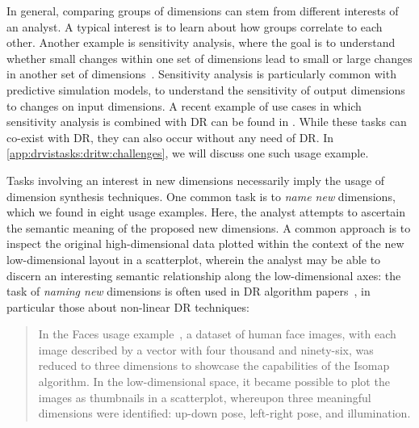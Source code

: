 In general, comparing groups of dimensions can stem from different interests of an analyst. 
A typical interest is to learn about how groups correlate to each other. 
Another example is sensitivity analysis, where the goal is to understand whether small changes within one set of dimensions lead to small or large changes in another set of dimensions~\cite{Booshehrian2012,Piringer2010,Pretorius2011}. 
Sensitivity analysis is particularly common with predictive simulation models, to understand the sensitivity of output dimensions to changes on input dimensions. 
A recent example of use cases in which sensitivity analysis is combined with \ac{DR} can be found in \citet{Bergner2013}.
While these tasks can co-exist with \ac{DR}, they can also occur without any need of \ac{DR}. In \autoref{app:drvistasks:dritw:challenges}, we will discuss one such usage example.

Tasks involving an interest in new dimensions necessarily imply the usage of dimension synthesis techniques. 
One common task is to {\it name new} dimensions, which we found in eight usage examples. Here, the analyst attempts to ascertain the semantic meaning of the proposed new dimensions. 
A common approach is to inspect the original high-dimensional data plotted within the context of the new low-dimensional layout in a scatterplot, wherein the analyst may be able to discern an interesting semantic relationship along the low-dimensional axes: the task of {\it naming new} dimensions is often used in \ac{DR} algorithm papers~\cite{Buja2002,Tenenbaum2000}, in particular those about non-linear \ac{DR} techniques:

\begin{quotation}
    In the {\sc Faces} usage example~\cite{Tenenbaum2000}, a dataset of human face images, with each image described by a vector with four thousand and ninety-six, was reduced to three dimensions to showcase the capabilities of the Isomap algorithm. 
    In the low-dimensional space, it became possible to plot the images as thumbnails in a scatterplot, whereupon three meaningful dimensions were identified: up-down pose, left-right pose, and illumination. 
\end{quotation}

